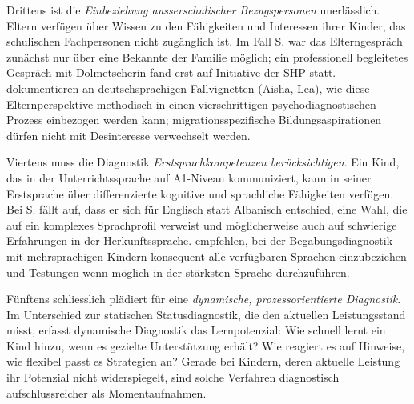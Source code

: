 \documentclass[ngerman, a4paper]{article}
\begin{document}
Drittens ist die \textit{Einbeziehung ausserschulischer Bezugspersonen} unerlässlich.
Eltern verfügen über Wissen zu den Fähigkeiten und Interessen ihrer Kinder, das
schulischen Fachpersonen nicht zugänglich ist. Im Fall S. war das Elterngespräch zunächst
nur über eine Bekannte der Familie möglich; ein professionell begleitetes Gespräch mit
Dolmetscherin fand erst auf Initiative der SHP statt.
\textcite[S.\,239--247]{gauckreimann2021psychdiagnostik} dokumentieren an
deutschsprachigen Fallvignetten (Aisha, Lea), wie diese Elternperspektive
methodisch in einen vier­schrittigen psychodiagnostischen Prozess
einbezogen werden kann; migrationsspezifische Bildungsaspirationen dürfen
nicht mit Desinteresse verwechselt werden.

Viertens muss die Diagnostik \textit{Erstsprachkompetenzen berücksichtigen}. Ein Kind,
das in der Unterrichtssprache auf A1-Niveau kommuniziert, kann in seiner Erstsprache
über differenzierte kognitive und sprachliche Fähigkeiten verfügen. Bei S. fällt auf,
dass er sich für Englisch statt Albanisch entschied, eine Wahl, die auf ein komplexes
Sprachprofil verweist und möglicherweise auch auf schwierige Erfahrungen in der
Herkunftssprache. \textcite[S.\,76--78]{kellerkoller2021hellekoepfe}
empfehlen, bei der Begabungsdiagnostik mit mehrsprachigen Kindern konsequent
alle verfügbaren Sprachen einzubeziehen und Testungen wenn möglich in der
stärksten Sprache durchzuführen.

Fünftens schliesslich plädiert
\textcite[S.\,224--238]{muelleroppliger2021paeddiagnostik} für eine
\textit{dynamische, prozessorientierte Diagnostik}. Im Unterschied zur
statischen Statusdiagnostik, die den aktuellen Leistungsstand misst,
erfasst dynamische Diagnostik das Lernpotenzial: Wie schnell lernt ein
Kind hinzu, wenn es gezielte Unterstützung erhält? Wie reagiert es auf
Hinweise, wie flexibel passt es Strategien an? Gerade bei Kindern,
deren aktuelle Leistung ihr Potenzial nicht widerspiegelt, sind solche
Verfahren diagnostisch aufschlussreicher als Momentaufnahmen.
\end{document}
